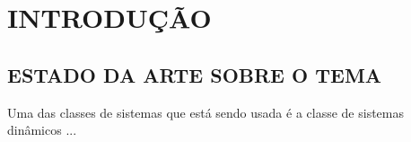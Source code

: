 \section{\textbf{INTRODUÇÃO}} \label{cap:introducao}
\vspace{0.5cm}


\subsection{ESTADO DA ARTE SOBRE O TEMA}
\vspace{0.5cm}

Uma das classes de sistemas que está sendo usada é a classe de sistemas dinâmicos \cite{yan2018identification}... 
